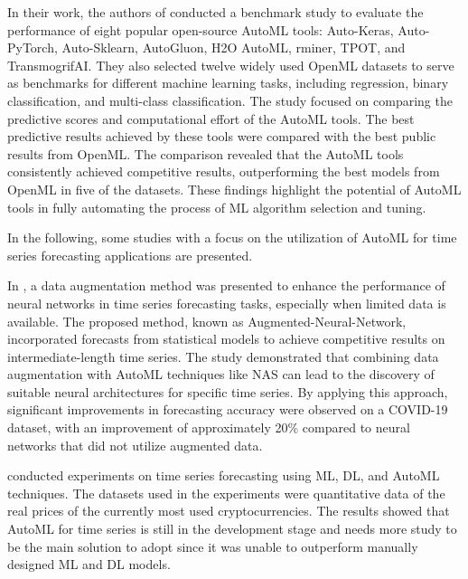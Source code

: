 In their work, the authors of \cite{9534091} conducted a benchmark study to evaluate the performance of eight popular open-source AutoML tools: Auto-Keras, Auto-PyTorch, Auto-Sklearn, AutoGluon, H2O AutoML, rminer, TPOT, and TransmogrifAI.
They also selected twelve widely used OpenML datasets to serve as benchmarks for different machine learning tasks, including regression, binary classification, and multi-class classification.
The study focused on comparing the predictive scores and computational effort of the AutoML tools.
The best predictive results achieved by these tools were compared with the best public results from OpenML.
The comparison revealed that the AutoML tools consistently achieved competitive results, outperforming the best models from OpenML in five of the datasets.
These findings highlight the potential of AutoML tools in fully automating the process of ML algorithm selection and tuning.

In the following, some studies with a focus on the utilization of AutoML for time series forecasting applications are presented.

In \cite{9564380}, a data augmentation method was presented to enhance the performance of neural networks in time series forecasting tasks, especially when limited data is available. 
The proposed method, known as Augmented-Neural-Network, incorporated forecasts from statistical models to achieve competitive results on intermediate-length time series.
The study demonstrated that combining data augmentation with AutoML techniques like NAS can lead to the discovery of suitable neural architectures for specific time series.
By applying this approach, significant improvements in forecasting accuracy were observed on a COVID-19 dataset, with an improvement of approximately 20\% compared to neural networks that did not utilize augmented data.

\cite{su142215292} conducted experiments on time series forecasting using ML, DL, and AutoML techniques.
The datasets used in the experiments were quantitative data of the real prices of the currently most used cryptocurrencies.
The results showed that AutoML for time series is still in the development stage and needs more study to be the main solution to adopt since it was unable to outperform manually designed ML and DL models.

